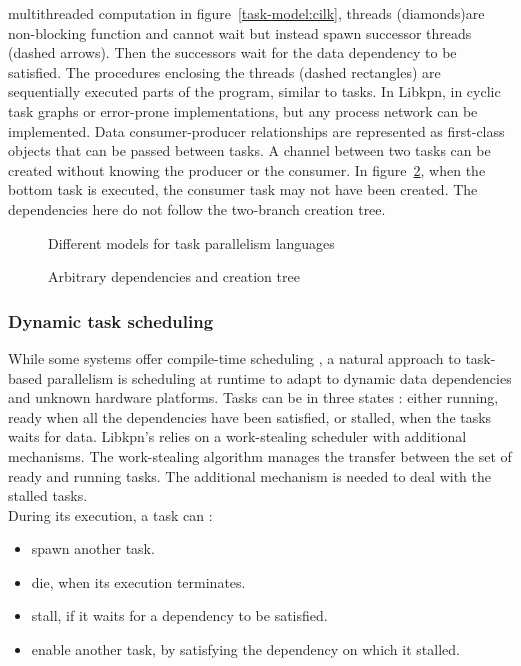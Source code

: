 \documentclass[a4paper,11pt]{article}
\begin{document}
multithreaded computation in figure~\ref{task-model:cilk}, threads (diamonds)are non-blocking function and
cannot wait but instead spawn successor threads (dashed arrows). Then the successors
wait for the data dependency to be satisfied. The procedures enclosing the threads (dashed
rectangles) are sequentially executed parts of the program, similar to tasks. In Libkpn,
in cyclic task graphs or error-prone implementations, but any process network can be
implemented. Data consumer-producer relationships are represented as first-class objects
that can be passed between tasks. A channel between two tasks can be created without
knowing the producer or the consumer. In figure~\ref{task-model-libkpn}, when the bottom task is executed,
the consumer task may not have been created. The dependencies here do not follow the
two-branch creation tree.
\vspace{0.5cm}
\begin{figure}[h]
 
 \caption{Different models for task parallelism languages}
 \label{task-model}
\end{figure}

\begin{figure}[h]
  \begin{center}
  
  \end{center}
 \caption{Arbitrary dependencies and creation tree}
 \label{task-model-libkpn}
\end{figure}


\subsubsection{Dynamic task scheduling}
While some systems offer compile-time scheduling \cite{thies2002streamit}, a natural approach to task-based
parallelism is scheduling at runtime to adapt to dynamic data dependencies and unknown
hardware platforms. Tasks can be in three states : either running, ready when all the
dependencies have been satisfied, or stalled, when the tasks waits for data. Libkpn’s relies
on a work-stealing scheduler with additional mechanisms. The work-stealing algorithm
\cite{blumofe_scheduling_1999} manages the transfer between the set of ready and running tasks. The additional
mechanism is needed to deal with the stalled tasks. \\
During its execution, a task can :
\begin{itemize}
 \item spawn another task.
 \item die, when its execution terminates.
 \item stall, if it waits for a dependency to be satisfied.
  \item enable another task, by satisfying the dependency on which it stalled.
\end{itemize}
\end{document}
